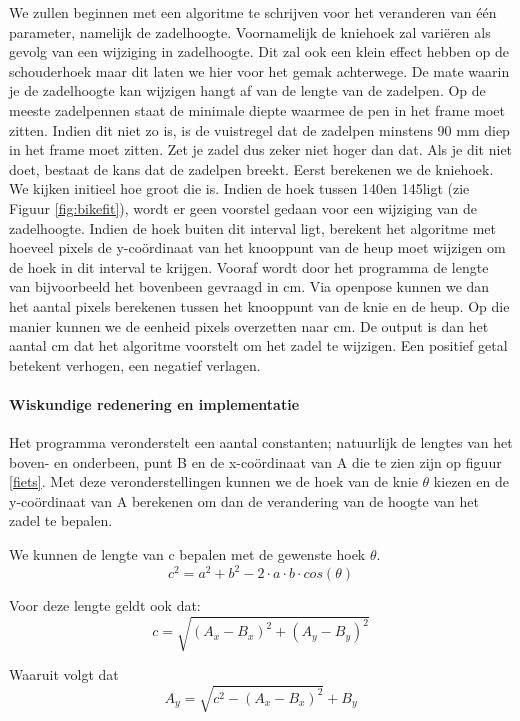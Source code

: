 \documentclass[a4paper,twoside,kulak]{kulakreport}
\begin{document}
We zullen beginnen met een algoritme te schrijven voor het veranderen van één parameter, namelijk de zadelhoogte. Voornamelijk de kniehoek zal variëren als gevolg van een wijziging in zadelhoogte. Dit zal ook een klein effect hebben op de schouderhoek maar dit laten we hier voor het gemak achterwege. De mate waarin je de zadelhoogte kan wijzigen hangt af van de lengte van de zadelpen. Op de meeste zadelpennen staat de minimale diepte waarmee de pen in het frame moet zitten. Indien dit niet zo is, is de vuistregel dat de zadelpen minstens 90 \si{mm} diep in het frame moet zitten. Zet je zadel dus zeker niet hoger dan dat. Als je dit niet doet, bestaat de kans dat de zadelpen breekt.
Eerst berekenen we de kniehoek. We kijken initieel hoe groot die is. Indien de hoek tussen 140\degree en 145\degree ligt (zie Figuur \ref{fig:bikefit}), wordt er geen voorstel gedaan voor een wijziging van de zadelhoogte. Indien de hoek buiten dit interval ligt, berekent het algoritme met hoeveel pixels de y-coördinaat van het knooppunt van de heup moet wijzigen om de hoek in dit interval te krijgen. Vooraf wordt door het programma de lengte van bijvoorbeeld het bovenbeen gevraagd in \si{cm}. Via openpose kunnen we dan het aantal pixels berekenen tussen het knooppunt van de knie en de heup. Op die manier kunnen we de eenheid pixels overzetten naar \si{cm}. De output is dan het aantal \si{cm} dat het algoritme voorstelt om het zadel te wijzigen. Een positief getal betekent verhogen, een negatief verlagen.

\paragraph{Wiskundige redenering en implementatie}
Het programma veronderstelt een aantal constanten; natuurlijk de lengtes van het boven- en onderbeen, punt B en de x-coördinaat van A die te zien zijn op figuur \ref{fiets}. Met deze veronderstellingen kunnen we de hoek van de knie $\theta$ kiezen en de y-coördinaat van A berekenen om dan de verandering van de hoogte van het zadel te bepalen.

We kunnen de lengte van c bepalen met de gewenste hoek $\theta$.
\[c^2 = a^2 + b^2 -2\cdot a \cdot b \cdot cos(\theta)\]

Voor deze lengte geldt ook dat:
\[c = \sqrt{(A_x - B_x)^2 + (A_y - B_y)^2}\]

Waaruit volgt dat
\[A_y = \sqrt{c^2 - (A_x - B_x)^2} + B_y\]
\end{document}
